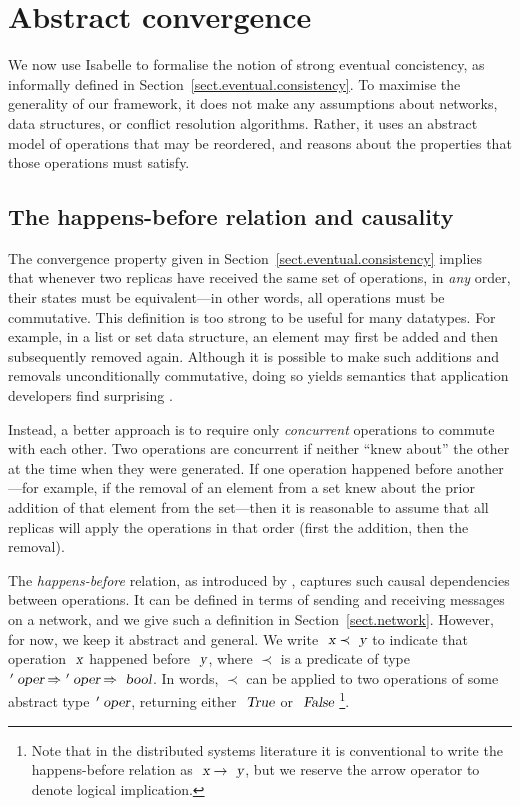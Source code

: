 \section{Abstract convergence}
\label{sect.abstract.convergence}

We now use Isabelle to formalise the notion of strong eventual concistency, as informally defined in Section~\ref{sect.eventual.consistency}.
To maximise the generality of our framework, it does not make any assumptions about networks, data structures, or conflict resolution algorithms.
Rather, it uses an abstract model of operations that may be reordered, and reasons about the properties that those operations must satisfy.

\subsection{The happens-before relation and causality}\label{sect.happens.before}

The convergence property given in Section~\ref{sect.eventual.consistency} implies that whenever two replicas have received the same set of operations, in \emph{any} order, their states must be equivalent---in other words, all operations must be commutative.
This definition is too strong to be useful for many datatypes.
For example, in a list or set data structure, an element may first be added and then subsequently removed again.
Although it is possible to make such additions and removals unconditionally commutative, doing so yields semantics that application developers find surprising \cite{Bieniusa:2012wu,Bieniusa:2012gt}.

Instead, a better approach is to require only \emph{concurrent} operations to commute with each other.
Two operations are concurrent if neither ``knew about'' the other at the time when they were generated.
If one operation happened before another---for example, if the removal of an element from a set knew about the prior addition of that element from the set---then it is reasonable to assume that all replicas will apply the operations in that order (first the addition, then the removal).

The \emph{happens-before} relation, as introduced by \citet{Lamport:1978jq}, captures such causal dependencies between operations.
It can be defined in terms of sending and receiving messages on a network, and we give such a definition in Section~\ref{sect.network}.
However, for now, we keep it abstract and general.
We write $\isa{x} \prec \isa{y}$ to indicate that operation $\isa{x}$ happened before $\isa{y}$, where $\prec$ is a predicate of type $\isacharprime\isa{oper} \mathbin{\isasymRightarrow} \isacharprime\isa{oper} \mathbin{\isasymRightarrow} \isa{bool}$.
In words, $\prec$ can be applied to two operations of some abstract type $\isacharprime\isa{oper}$, returning either $\isa{True}$ or $\isa{False}$
\footnote{Note that in the distributed systems literature it is conventional to write the happens-before relation as $\isa{x} \rightarrow \isa{y}$, but we reserve the arrow operator to denote logical implication.}.

